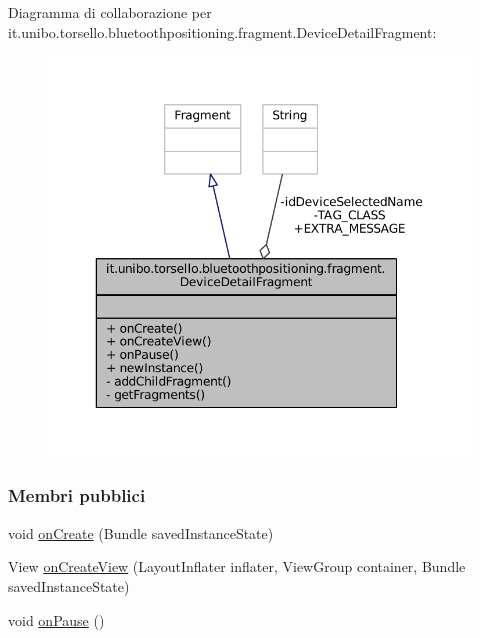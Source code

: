 Diagramma di collaborazione per it.\+unibo.\+torsello.\+bluetoothpositioning.\+fragment.\+Device\+Detail\+Fragment\+:
\nopagebreak
\begin{figure}[H]
\begin{center}
\leavevmode
\includegraphics[width=350pt]{classit_1_1unibo_1_1torsello_1_1bluetoothpositioning_1_1fragment_1_1DeviceDetailFragment__coll__graph}
\end{center}
\end{figure}
\subsubsection*{Membri pubblici}
\begin{DoxyCompactItemize}
\item 
void \hyperlink{classit_1_1unibo_1_1torsello_1_1bluetoothpositioning_1_1fragment_1_1DeviceDetailFragment_af33d782c107be10fe752f16f04cc5e5d_af33d782c107be10fe752f16f04cc5e5d}{on\+Create} (Bundle saved\+Instance\+State)
\item 
View \hyperlink{classit_1_1unibo_1_1torsello_1_1bluetoothpositioning_1_1fragment_1_1DeviceDetailFragment_a6d43be281b577e0d9f2540fea30c2fdf_a6d43be281b577e0d9f2540fea30c2fdf}{on\+Create\+View} (Layout\+Inflater inflater, View\+Group container, Bundle saved\+Instance\+State)
\item 
void \hyperlink{classit_1_1unibo_1_1torsello_1_1bluetoothpositioning_1_1fragment_1_1DeviceDetailFragment_a1ed4762356dd3067ce48aa73da50404e_a1ed4762356dd3067ce48aa73da50404e}{on\+Pause} ()
\end{DoxyCompactItemize}
